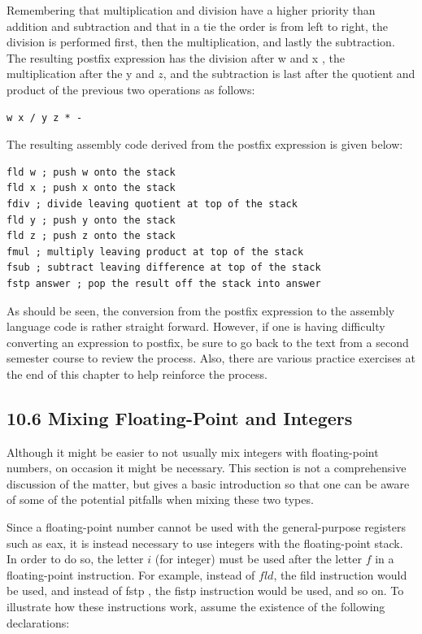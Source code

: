 \documentclass[10pt]{book}
\begin{document}
\begin{center}
\begin{center}
\begin{center}
\begin{center}
Remembering that multiplication and division have a higher priority than addition and subtraction and that in a tie the order is from left to right, the division is performed first, then the multiplication, and lastly the subtraction. The resulting postfix expression has the division after w and x , the multiplication after the y and $z$, and the subtraction is last after the quotient and product of the previous two operations as follows:

\begin{verbatim}
w x / y z * -
\end{verbatim}

The resulting assembly code derived from the postfix expression is given below:

\begin{verbatim}
fld w ; push w onto the stack
fld x ; push x onto the stack
fdiv ; divide leaving quotient at top of the stack
fld y ; push y onto the stack
fld z ; push z onto the stack
fmul ; multiply leaving product at top of the stack
fsub ; subtract leaving difference at top of the stack
fstp answer ; pop the result off the stack into answer
\end{verbatim}

As should be seen, the conversion from the postfix expression to the assembly language code is rather straight forward. However, if one is having difficulty converting an expression to postfix, be sure to go back to the text from a second semester course to review the process. Also, there are various practice exercises at the end of this chapter to help reinforce the process.

\subsection*{10.6 Mixing Floating-Point and Integers}
Although it might be easier to not usually mix integers with floating-point numbers, on occasion it might be necessary. This section is not a comprehensive discussion of the matter, but gives a basic introduction so that one can be aware of some of the potential pitfalls when mixing these two types.

Since a floating-point number cannot be used with the general-purpose registers such as eax, it is instead necessary to use integers with the floating-point stack. In order to do so, the letter $i$ (for integer) must be used after the letter $f$ in a floating-point instruction. For example, instead of $f l d$, the fild instruction would be used, and instead of fstp , the fistp instruction would be used, and so on. To illustrate how these instructions work, assume the existence of the following declarations:


\end{center}
\end{center}
\end{center}
\end{center}
\end{document}
